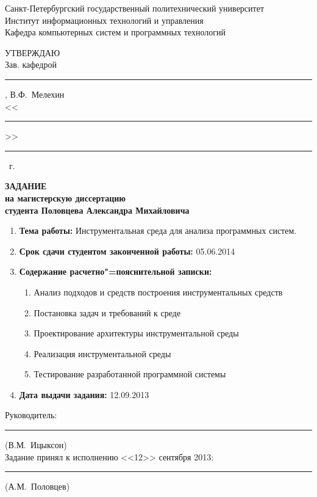 \documentclass[%
  a5paper,
  subf,
  href,
  master,
  dotsinheaders
]{csse-fcs}
\begin{document}
\pagestyle{empty}
\begin{center}
    Санкт-Петербургский государственный политехнический университет\\
    Институт информационных технологий и управления \\
    Кафедра компьютерных систем и программных технологий \\
\end{center}
\begin{flushright}
    \MakeUppercase{Утверждаю} \\
    Зав. кафедрой\\
    \rule{5em}{1sp}, В.Ф.~Мелехин\\
    <<\rule{2em}{1sp}>> \rule{7em}{1sp} \the\year~г.
\end{flushright}
\begin{center}
    \bf
    \MakeUppercase{Задание} \\
    на магистерскую диссертацию \\
    студента Половцева Александра Михайловича
\end{center}

\begin{enumerate}
    \item \textbf{Тема работы:} Инструментальная среда для анализа программных
    систем.
    \item \textbf{Срок сдачи студентом законченной работы:} 05.06.2014
    \item \textbf{Содержание расчетно"=пояснительной записки:}
    \begin{enumerate}[label=\arabic{*})]
        \item Анализ подходов и средств построения инструментальных средств
        \item Постановка задач и требований к среде
        \item Проектирование архитектуры инструментальной среды
        \item Реализация инструментальной среды
        \item Тестирование разработанной программной системы
    \end{enumerate}
    \item \textbf{Дата выдачи задания:} 12.09.2013
\end{enumerate}

\begin{flushright}
    Руководитель: \rule{7em}{1sp} (В.М.~Ицыксон) \\
    Задание принял к исполнению <<12>> сентября 2013: \\
    \rule{7em}{1sp} (А.М.~Половцев) \\
\end{flushright}
\end{document}
